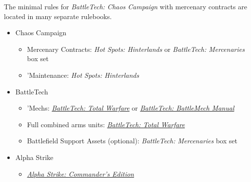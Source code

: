 The minimal rules for \emph{BattleTech: Chaos Campaign} with mercenary contracts are located in many separate rulebooks.

\begin{itemize}

\item Chaos Campaign

  \begin{itemize}

    \item Mercenary Contracts: \emph{Hot Spots: Hinterlands} or \emph{BattleTech: Mercenaries} box set

    \item 'Maintenance: \emph{Hot Spots: Hinterlands}

  \end{itemize}

  \item BattleTech

  \begin{itemize}

    \item 'Mechs: \emph{\href{https://store.catalystgamelabs.com/products/battletech-total-warfare-pdf}{BattleTech: Total Warfare}} or  \emph{\href{https://store.catalystgamelabs.com/products/battletech-battlemech-manual-book-pdf-combo}{BattleTech: BattleMech Manual}}

    \item Full combined arms units: \emph{\href{https://store.catalystgamelabs.com/products/battletech-total-warfare-pdf}{BattleTech: Total Warfare}}

    \item Battlefield Support Assets (optional): \emph{BattleTech: Mercenaries} box set

  \end{itemize}

  \item Alpha Strike

  \begin{itemize}

    \item \emph{\href{https://store.catalystgamelabs.com/products/battletech-alpha-strike-commanders-edition}{Alpha Strike: Commander's Edition}}

  \end{itemize}

\end{itemize}
